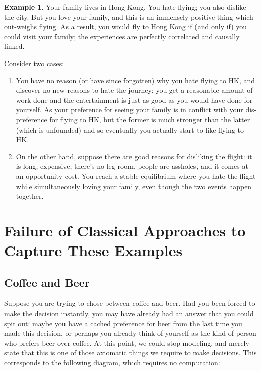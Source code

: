 \documentclass{article}
\theoremstyle{plain}
\theoremstyle{definition}
\newtheorem{example}{Example}[section]
\theoremstyle{remark}
\newcommand\lab[1]{(#1)(lab-#1)}
\begin{document}
	\begin{example}
		Your family lives in Hong Kong. You hate flying; you also dislike the city. But you love your family, and this is an immensely positive thing which out-weighs flying. As a result, you would fly to Hong Kong if (and only if) you could visit your family; the experiences are perfectly correlated and causally linked.
		
		Consider two cases:
		\begin{enumerate}[nosep]
			\item You have no reason (or have since forgotten) why you hate flying to HK, and discover no new reasons to hate the journey: you get a reasonable amount of work done and the entertainment is just as good as you would have done for yourself. As your preference for seeing your family is in conflict with your dis-preference for flying to HK, but the former is much stronger than the latter (which is unfounded) and so eventually you actually start to like flying to HK.
			\item On the other hand, suppose there are good reasons for disliking the flight: it is long, expensive, there's no leg room, people are assholes, and it comes at an opportunity cost. You reach a stable equilibrium where you hate the flight while simultaneously loving your family, even though the two events happen together.
		\end{enumerate}
	\end{example}

	
					

	\section{Failure of Classical Approaches to Capture These Examples}
	\subsection{Coffee and Beer}
	Suppose you are trying to chose between coffee and beer. Had you been forced to make the decision instantly, you may have already had an answer that you could spit out: maybe you have a cached preference for beer from the last time you made this decision, or perhaps you already think of yourself as the kind of person who prefers beer over coffee. At this point, we could stop modeling, and merely state that this is one of those axiomatic things we require to make decisions. This corresponds to the following diagram, which requires no computation:
	\begin{center}
	\end{center}
	
\end{document}
